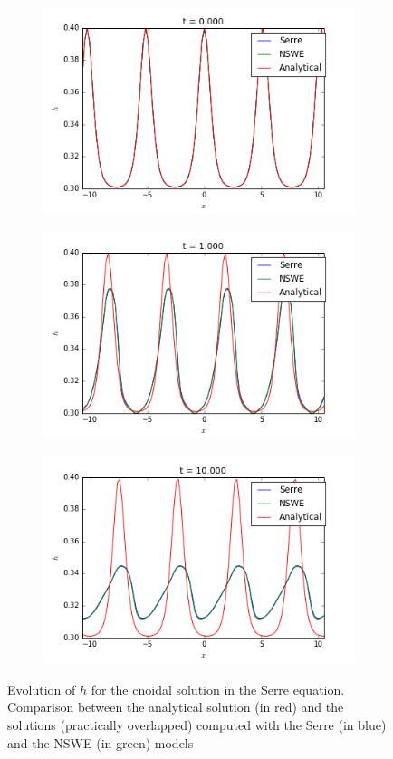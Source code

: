 \begin{figure}[h!]
	\begin{subfigure}{.3\linewidth}
		\includegraphics[scale=.3]{figures/Serre/cnoidal1h.png}	
	\end{subfigure}
	\begin{subfigure}{.3\linewidth}
		\includegraphics[scale=.3]{figures/Serre/cnoidal2h.png}	
	\end{subfigure}
	\begin{subfigure}{.3\linewidth}
		\includegraphics[scale=.3]{figures/Serre/cnoidal3h.png}	
	\end{subfigure}
	\caption{Evolution of $h$ for the cnoidal solution in the Serre equation. Comparison between the analytical solution (in red) and the solutions (practically overlapped) computed with the Serre (in blue) and the NSWE (in green)  models \label{fig:cnoidalh}}
\end{figure}

